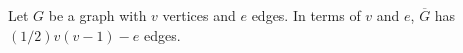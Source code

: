 Let $G$ be a graph with $v$ vertices and $e$ edges. In terms of $v$ and $e$,
$\overline{G}$ has $(1/2)v(v-1) - e$ edges.

